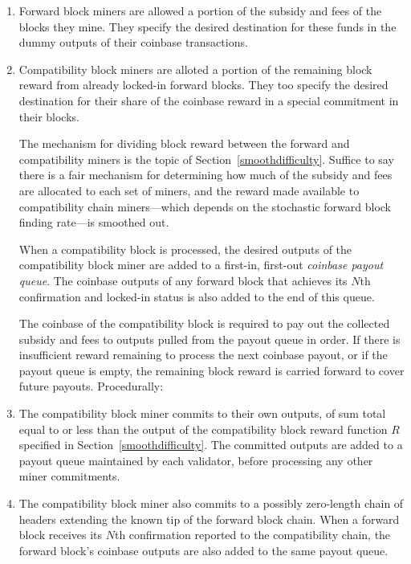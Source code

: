 \begin{enumerate}
  \item
    Forward block miners are allowed a portion of the subsidy and fees
    of the blocks they mine.  They specify the desired destination for
    these funds in the dummy outputs of their coinbase transactions.

  \item
    Compatibility block miners are alloted a portion of the remaining
    block reward from already locked-in forward blocks.  They too
    specify the desired destination for their share of the coinbase
    reward in a special commitment in their blocks.

The mechanism for dividing block reward between the forward and
compatibility miners is the topic of Section~\ref{smoothdifficulty}.
Suffice to say there is a fair mechanism for determining how much of
the subsidy and fees are allocated to each set of miners, and the
reward made available to compatibility chain miners---which depends on
the stochastic forward block finding rate---is smoothed out.

When a compatibility block is processed, the desired outputs of the
compatibility block miner are added to a first-in, first-out
\emph{coinbase payout queue}.  The coinbase outputs of any forward
block that achieves its $N$th confirmation and locked-in status is
also added to the end of this queue.

The coinbase of the compatibility block is required to pay out the
collected subsidy and fees to outputs pulled from the payout queue in
order.  If there is insufficient reward remaining to process the next
coinbase payout, or if the payout queue is empty, the remaining block
reward is carried forward to cover future payouts.  Procedurally:

  \item
    The compatibility block miner commits to their own outputs, of sum
    total equal to or less than the output of the compatibility block
    reward function $R$ specified in Section~\ref{smoothdifficulty}.
    The committed outputs are added to a payout queue maintained by
    each validator, before processing any other miner commitments.

  \item
    The compatibility block miner also commits to a possibly
    zero-length chain of headers extending the known tip of the
    forward block chain.  When a forward block receives its $N$th
    confirmation reported to the compatibility chain, the forward
    block's coinbase outputs are also added to the same payout queue.


\end{enumerate}
